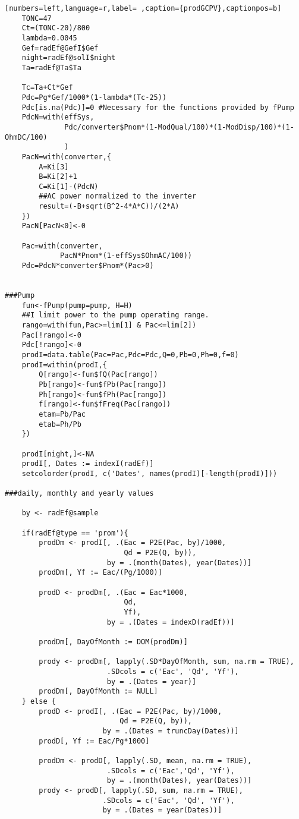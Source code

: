 \begin{lstlisting}[numbers=left,language=r,label= ,caption={prodGCPV},captionpos=b]
    TONC=47
    Ct=(TONC-20)/800
    lambda=0.0045
    Gef=radEf@GefI$Gef
    night=radEf@solI$night
    Ta=radEf@Ta$Ta

    Tc=Ta+Ct*Gef
    Pdc=Pg*Gef/1000*(1-lambda*(Tc-25))
    Pdc[is.na(Pdc)]=0 #Necessary for the functions provided by fPump
    PdcN=with(effSys,
              Pdc/converter$Pnom*(1-ModQual/100)*(1-ModDisp/100)*(1-OhmDC/100)
              )
    PacN=with(converter,{
        A=Ki[3]
        B=Ki[2]+1
        C=Ki[1]-(PdcN)
        ##AC power normalized to the inverter
        result=(-B+sqrt(B^2-4*A*C))/(2*A)
    })
    PacN[PacN<0]<-0

    Pac=with(converter,
             PacN*Pnom*(1-effSys$OhmAC/100))
    Pdc=PdcN*converter$Pnom*(Pac>0)


###Pump
    fun<-fPump(pump=pump, H=H)
    ##I limit power to the pump operating range.
    rango=with(fun,Pac>=lim[1] & Pac<=lim[2]) 
    Pac[!rango]<-0
    Pdc[!rango]<-0
    prodI=data.table(Pac=Pac,Pdc=Pdc,Q=0,Pb=0,Ph=0,f=0)	
    prodI=within(prodI,{
        Q[rango]<-fun$fQ(Pac[rango])
        Pb[rango]<-fun$fPb(Pac[rango])
        Ph[rango]<-fun$fPh(Pac[rango])
        f[rango]<-fun$fFreq(Pac[rango])
        etam=Pb/Pac
        etab=Ph/Pb
    })

    prodI[night,]<-NA
    prodI[, Dates := indexI(radEf)]
    setcolorder(prodI, c('Dates', names(prodI)[-length(prodI)]))

###daily, monthly and yearly values

    by <- radEf@sample

    if(radEf@type == 'prom'){
        prodDm <- prodI[, .(Eac = P2E(Pac, by)/1000,
                            Qd = P2E(Q, by)),
                        by = .(month(Dates), year(Dates))]
        prodDm[, Yf := Eac/(Pg/1000)]

        prodD <- prodDm[, .(Eac = Eac*1000,
                            Qd,
                            Yf),
                        by = .(Dates = indexD(radEf))]

        prodDm[, DayOfMonth := DOM(prodDm)]

        prody <- prodDm[, lapply(.SD*DayOfMonth, sum, na.rm = TRUE),
                        .SDcols = c('Eac', 'Qd', 'Yf'),
                        by = .(Dates = year)]
        prodDm[, DayOfMonth := NULL]
    } else {
        prodD <- prodI[, .(Eac = P2E(Pac, by)/1000,
                           Qd = P2E(Q, by)),
                       by = .(Dates = truncDay(Dates))]
        prodD[, Yf := Eac/Pg*1000]

        prodDm <- prodD[, lapply(.SD, mean, na.rm = TRUE),
                        .SDcols = c('Eac','Qd', 'Yf'),
                        by = .(month(Dates), year(Dates))]
        prody <- prodD[, lapply(.SD, sum, na.rm = TRUE),
                       .SDcols = c('Eac', 'Qd', 'Yf'),
                       by = .(Dates = year(Dates))]


\end{lstlisting}
